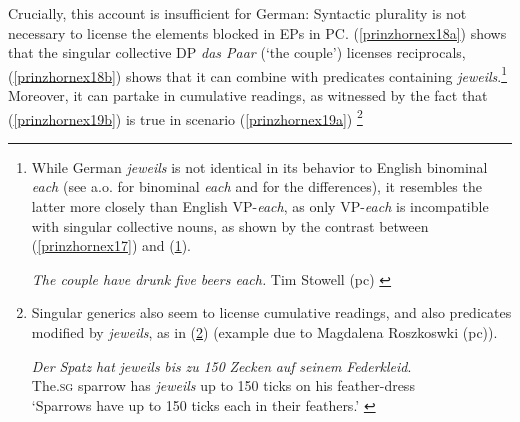 \documentclass[output=paper,colorlinks,citecolor=brown,
]{langscibook}
\begin{document}
Crucially, this account is insufficient for German: Syntactic plurality is not necessary to license the elements  blocked in EPs in PC. (\ref{prinzhornex18a}) shows that the singular collective DP {\it  das Paar} (`the couple') licenses reciprocals,  (\ref{prinzhornex18b}) shows that it can combine with predicates containing \textit{jeweils}.\footnote{While German  \textit{jeweils} is not identical in its behavior to English binominal  \textit{each} (see \citealt{Stowell:2013} a.o. for binominal \textit{each} and \citealt{Zimmermann:2002} for the differences), it resembles the latter more closely than English VP-\textit{each}, as only VP-\textit{each} is incompatible with singular collective nouns, as shown by the contrast between (\ref{prinzhornex17}) and (\ref{prinzhornfnnex5}).

\ea    \textit{The couple have drunk five beers each.} \hfill Tim Stowell (pc)  \label{prinzhornfnnex5} \z  

} Moreover, it can partake in cumulative readings, as witnessed by the fact that (\ref{prinzhornex19b}) is true in scenario (\ref{prinzhornex19a}) \footnote{Singular generics also seem to license cumulative readings,  and also predicates modified by \textit{jeweils}, as in (\ref{prinzhornexfn45}) (example due to Magdalena Roszkoswki (pc)).

\ea 
\gll \textit{Der} \textit{Spatz} \textit{hat} \textit{jeweils} \textit{bis} \textit{zu} \textit{150} \textit{Zecken} \textit{auf} \textit{seinem} \textit{Federkleid}.\\
The.\textsc{sg} sparrow has \textit{jeweils} up to 150 ticks on his feather-dress\\
\glt `Sparrows have up to 150 ticks each in their feathers.'
\label{prinzhornexfn45} 
\z

}
\end{document}
